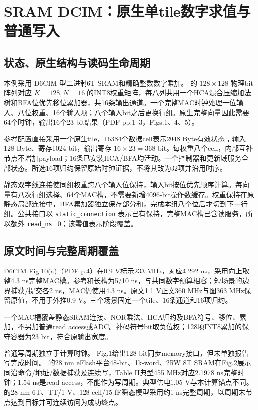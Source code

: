\section{SRAM DCIM：原生单tile数字求值与普通写入}

\subsection{状态、原生结构与读码生命周期}

本例采用 D6CIM 型二进制6T SRAM和精确整数数字乘加。 的 $128\times128$ 物理bit阵列对应 $K=128,N=16$ 的INT8权重矩阵，每八列共用一个HCA混合压缩加法树和BFA位优先移位累加器，共16条输出通道。一个完整MAC时钟处理一位输入、八位权重、16个输入项；八个输入bit之后更换行组。原生完整向量因此需要64个时钟，输出16个23-bit结果（PDF pp.1--3，Figs.1、4、5）。

参考配置直接采用一个原生tile，16384个数据cell表示2048 Byte有效状态；输入128 Byte、寄存1024 bit，输出寄存 $16\times23=368$ bit。每权重八个cell，内部互补节点不增加payload；16条已安装HCA/BFA均活动。一个控制器和更新域服务全部状态。所选16项归约保留原始时钟证据，不将其改为32项并沿用时序。

静态双字线连接使同组权重跨八个输入位保持，输入bit按位优先顺序计算。每向量有八次行组选择、64个MAC槽，不需要新增4096-bit操作数缓存。权重保持在原静态局部连接中，BFA累加器独立保存部分和，完成本组八个位后才切到下一行组。公共接口以 \texttt{static\_connection} 表示已有保持，完整MAC槽已含读服务，所以额外 \texttt{read\_ns}=0；该零值表示阶段覆盖。

\subsection{原文时间与完整周期覆盖}

D6CIM Fig.10(a)（PDF p.4）在0.9 V标示233 MHz，对应4.292 ns，采用向上取整4.3 ns完整MAC槽。参考和长槽为5/10 ns，与共同数字预算相容；短场景的边界捕获/提交各2 ns，MAC仍使用4.3 ns。原文1.1 V正文360 MHz与图363 MHz保留原值，不用于外推0.9 V。三个场景固定一个tile、16条通道和16项归约。

一个MAC槽覆盖静态SRAM连接、NOR乘法、HCA归约及BFA符号、移位、累加，不另加普通read access或ADC。补码符号bit取负位权；128项INT8累加的保守容器为23 bit，符合原输出宽度。

普通写周期独立于计算时钟。 Fig.1给出128-bit同步memory接口，但未单独报告写完成时间。 的28 nm eFlash平台48-bit、1k-word、2RW 8T SRAM在Fig.2展示同沿命令/地址/数据捕获及连续写，Table II典型455 MHz对应2.1978 ns完整时钟；1.54 ns是read access，不能作为写周期。典型供电1.05 V与本计算锚点不同。 的28 nm 6T、TT/1 V、128-cell/15 fF瞬态模型采用约1 ns完整周期，以周期末节点达到目标并可连续访问为成功终点。

